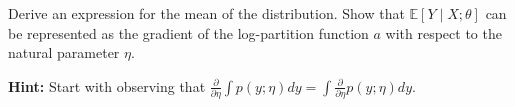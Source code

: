 \item {}
Derive an expression for the mean of the distribution. Show that
$\mathbb{E}[Y\mid X;\theta]$ can be represented as the gradient of the
log-partition function $a$ with respect to the natural parameter $\eta$.

\textbf{Hint:} Start with observing that $\frac{\partial}{\partial \eta} \int
p(y;\eta) dy = \int \frac{\partial}{\partial \eta} p(y;\eta) dy$.

\ifnum{}\fi
